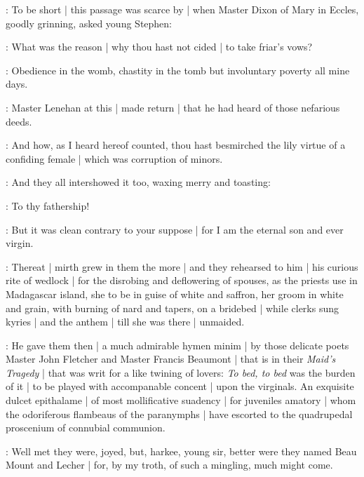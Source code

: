 

:
To be short |
this passage was scarce by |
when Master Dixon of Mary in Eccles,
goodly grinning,
asked young Stephen:

\dixon:
What was the reason |
why thou hast not cided |
to take friar's vows?

\stephen:
Obedience in the womb,
chastity in the tomb
but involuntary poverty all mine days.

:
Master Lenehan at this |
made return |
that he had heard of those nefarious deeds.

\lenehan:
And how,
as I heard hereof counted,
thou hast besmirched the lily virtue of a confiding female |
which was corruption of minors.

:
And they all intershowed it too,
waxing merry and toasting:

\All:
To thy fathership!

\stephen:
But it was clean contrary to your suppose |
for I am the eternal son and ever virgin.

:
Thereat |
mirth grew in them the more |
and they rehearsed to him |
his curious rite of wedlock |
for the disrobing and deflowering of spouses,
as the priests use in Madagascar island,
she to be in guise of white and saffron,
her groom in white and grain,
with burning of nard and tapers,
on a bridebed |
while clerks sung kyries |
and the anthem  |
till she was there |
unmaided.

:
He gave them then |
a much admirable hymen minim |
by those delicate poets Master John Fletcher and Master Francis Beaumont |
that is in their \emph{Maid's Tragedy} |
that was writ for a like twining of lovers:
\emph{To bed, to bed}
was the burden of it |
to be played with accompanable concent |
upon the virginals.
An exquisite dulcet epithalame |
of most mollificative suadency |
for juveniles amatory |
whom the odoriferous flambeaus of the paranymphs |
have escorted to the quadrupedal proscenium of connubial communion.

\dixon:
Well met they were,
joyed,
but,
harkee,
young sir,
better were they named Beau Mount and Lecher |
for,
by my troth,
of such a mingling,
much might come.

